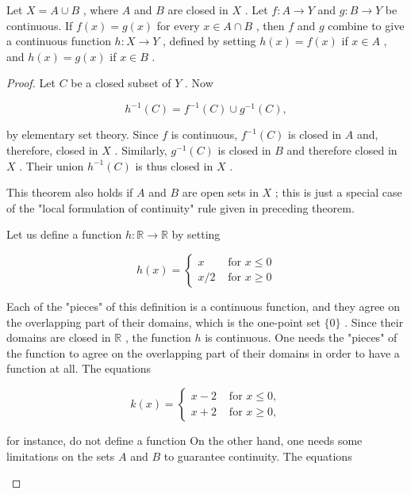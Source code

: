 \begin{theorem} Let \(X = A \cup  B\) , where \(A\) and \(B\) are closed in \(X\) . Let \(f : A \rightarrow  Y\) and \(g : B \rightarrow  Y\) be continuous. If \(f\left( x\right)  = g\left( x\right)\) for every \(x \in  A \cap  B\) , then \(f\) and \(g\) combine to give a continuous function \(h : X \rightarrow  Y\) , defined by setting \(h\left( x\right)  = f\left( x\right)\) if \(x \in  A\) , and \(h\left( x\right)  = g\left( x\right)\) if \(x \in  B\) .
\end{theorem}
\begin{proof}Let \(C\) be a closed subset of \(Y\) . Now

\[
{h}^{-1}\left( C\right)  = {f}^{-1}\left( C\right)  \cup  {g}^{-1}\left( C\right) ,
\]

by elementary set theory. Since \(f\) is continuous, \({f}^{-1}\left( C\right)\) is closed in \(A\) and, therefore, closed in \(X\) . Similarly, \({g}^{-1}\left( C\right)\) is closed in \(B\) and therefore closed in \(X\) . Their union \({h}^{-1}\left( C\right)\) is thus closed in \(X\) .

This theorem also holds if \(A\) and \(B\) are open sets in \(X\) ; this is just a special case of the "local formulation of continuity" rule given in preceding theorem.

\begin{example} Let us define a function \(h : \mathbb{R} \rightarrow  \mathbb{R}\) by setting

\[
h\left( x\right)  = \left\{  \begin{array}{ll} x & \text{ for }x \leq  0 \\  x/2 & \text{ for }x \geq  0 \end{array}\right.
\]

Each of the "pieces" of this definition is a continuous function, and they agree on the overlapping part of their domains, which is the one-point set \(\{ 0\}\) . Since their domains are closed in \(\mathbb{R}\) , the function \(h\) is continuous. One needs the "pieces" of the function to agree on the overlapping part of their domains in order to have a function at all. The equations

\[
k\left( x\right)  = \left\{  \begin{array}{ll} x - 2 & \text{ for }x \leq  0, \\  x + 2 & \text{ for }x \geq  0, \end{array}\right.
\]

for instance, do not define a function On the other hand, one needs some limitations on the sets \(A\) and \(B\) to guarantee continuity. The equations


\end{example}
\end{proof}
